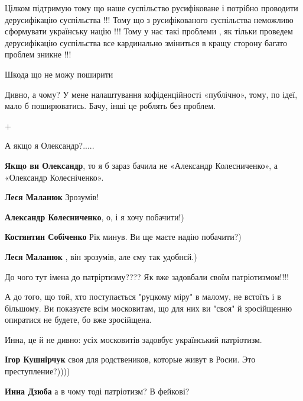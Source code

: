 \begin{itemize}

Цілком підтримую тому що наше суспільство русифіковане і потрібно проводити
дерусифікацію суспільства !!! Тому що з русифікованого суспільства неможливо
сформувати українську націю !!! Тому у нас такі проблеми , як тільки проведем
дерусифікацію суспільства все кардинально зміниться в кращу сторону багато
проблем зникне !!!


Шкода що не можу поширити

\begin{itemize} %
Дивно, а чому? У мене налаштування кофіденційності «публічно», тому, по ідеї, мало б поширюватись. Бачу, інші це роблять без проблем.
\end{itemize} %

+

А якщо я Олександр?.....

\begin{itemize} %
\textbf{Якщо ви Олександр}, то я б зараз бачила не «Александр Колесниченко», а «Олександр Колесніченко».

\textbf{Леся Маланюк} Зрозумів!

\textbf{Александр Колесниченко}, о, і я хочу побачити!)

\textbf{Костянтин Собіченко} Рік минув. Ви ще маєте надію побачити?)

\textbf{Леся Маланюк} , він зрозумів, але єму так удобнєй.)
\end{itemize} %


До чого тут імена до патріртизму???? Як вже задовбали своїм патріотизмом!!!!

\begin{itemize} %

А до того, що той, хто поступається "руцкому міру" в малому, не встоїть і в
більшому. Ви показуєте всім московитам, що для них ви "своя" й зросійщенню
опиратися не будете, бо вже зросійщена.

Инна, це й не дивно: усіх московитів задовбує український патріотизм.

\textbf{Ігор Кушнірчук} своя для родствеников, которые живут в Росии. Это преступление?))))

\textbf{Инна Дзюба} а в чому тоді патріотизм? В фейкові?


\end{itemize}
\end{itemize}
